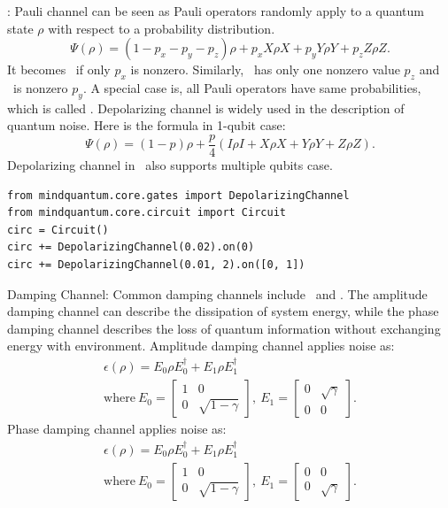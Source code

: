 \PauliChannel: Pauli channel can be seen as Pauli operators randomly apply to a quantum state $\rho$ with respect to a probability distribution.
\begin{equation}
    \Psi(\rho) = (1-p_x-p_y-p_z) \rho + p_x X \rho X + p_y Y \rho Y + p_z Z \rho Z.
\end{equation}
It becomes \BitFlipChannel\ if only $p_x$ is nonzero. Similarly, \PhaseFlipChannel\ has only one nonzero value $p_z$ and \BitPhaseFlipChannel\ is nonzero $p_y$. A special case is, all Pauli operators have same probabilities, which is called \DepolarizingChannel. Depolarizing channel is widely used in the description of quantum noise. Here is the formula in 1-qubit case:
\begin{equation}
    \Psi(\rho) =  (1-p) \rho + \frac{p}{4}(I\rho I+X\rho X+Y\rho Y+Z\rho Z).
\end{equation}
Depolarizing channel in \MindQuantum\ also supports multiple qubits case.
\begin{lstlisting}
from mindquantum.core.gates import DepolarizingChannel
from mindquantum.core.circuit import Circuit
circ = Circuit()
circ += DepolarizingChannel(0.02).on(0)
circ += DepolarizingChannel(0.01, 2).on([0, 1])
\end{lstlisting}

Damping Channel: Common damping channels include \AmplitudeDampingChannel\ and \PhaseDampingChannel. The amplitude damping channel can describe the dissipation of system energy, while the phase damping channel describes the loss of quantum information without exchanging energy with environment.
Amplitude damping channel applies noise as:
\begin{gather*}
    \epsilon(\rho) = E_0 \rho E_0^\dagger + E_1 \rho E_1^\dagger
    \\
    \text{where}\ {E_0}=\begin{bmatrix}1 & 0               \\
        0 & \sqrt{1-\gamma}\end{bmatrix},
    \ {E_1}=\begin{bmatrix}0 & \sqrt{\gamma} \\
        0 & 0\end{bmatrix}.
\end{gather*}
Phase damping channel applies noise as:
\begin{gather*}
    \epsilon(\rho) = E_0 \rho E_0^\dagger + E_1 \rho E_1^\dagger
    \\
    \text{where}\ {E_0}=\begin{bmatrix}1 & 0               \\
        0 & \sqrt{1-\gamma}\end{bmatrix},
    \ {E_1}=\begin{bmatrix}0 & 0             \\
        0 & \sqrt{\gamma}\end{bmatrix}.
\end{gather*}

